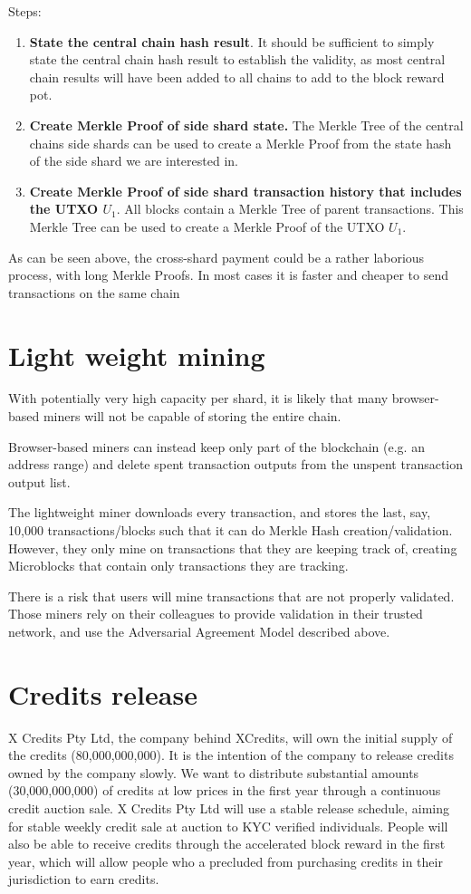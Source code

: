 \documentclass[a4paper,12pt]{article}
\begin{document}
Steps:
\begin{enumerate}
  \item \textbf{State the central chain hash result}. It should be sufficient to simply state the central chain hash result to establish the validity, as most central chain results will have been added to all chains to add to the block reward pot. 
  \item \textbf{Create Merkle Proof of side shard state.}  The Merkle Tree of the central chains side shards can be used to create a Merkle Proof from the state hash of the side shard we are interested in. 
  \item \textbf{Create Merkle Proof of side shard transaction history that includes the UTXO $U_1$}. All blocks contain a Merkle Tree of parent transactions. This Merkle Tree can be used to create a Merkle Proof of the UTXO $U_1$.
\end{enumerate}


As can be seen above, the cross-shard payment could be a rather laborious process, with long Merkle Proofs. In most cases it is faster and cheaper to send transactions on the same chain 




\section{Light weight mining}
With potentially very high capacity per shard, it is likely that many browser-based miners will not be capable of storing the entire chain. 

Browser-based miners can instead keep only part of the blockchain (e.g. an address range) and delete spent transaction outputs from the unspent transaction output list. 

The lightweight miner downloads every transaction, and stores the last, say, 10,000 transactions/blocks such that it can do Merkle Hash creation/validation. However, they only mine on transactions that they are keeping track of, creating Microblocks that contain only transactions they are tracking. 

There is a risk that users will mine transactions that are not properly validated. Those miners rely on their colleagues to provide validation in their trusted network, and use the Adversarial Agreement Model described above.


\section{Credits release}
X Credits Pty Ltd, the company behind XCredits, will own the initial supply of the credits (80,000,000,000). It is the intention of the company to release credits owned by the company slowly. We want to distribute substantial amounts (30,000,000,000) of credits at low prices in the first year through a continuous credit auction sale. X Credits Pty Ltd will use a stable release schedule, aiming for stable weekly credit sale at auction to KYC verified individuals. People will also be able to receive credits through the accelerated block reward in the first year, which will allow people who a precluded from purchasing credits in their jurisdiction to earn credits.
\end{document}

